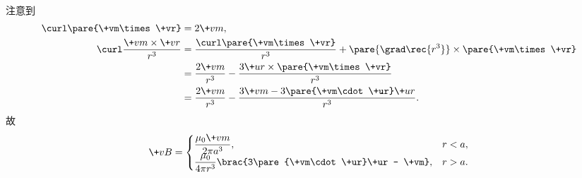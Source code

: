 \documentclass[hidelinks]{ctexart}
\begin{document}
\begin{sample}
\begin{ex}
\begin{align*}
        \end{align*}
        注意到
        \begin{align*}
            \curl \pare{\+vm\times \+vr} &= 2\+vm, \\
            \curl \frac{\+vm\times \+vr}{r^3} &= \frac{\curl\pare{\+vm\times \+vr}}{r^3} + \pare{\grad \rec{r^3}}\times \pare{\+vm\times \+vr} \\
            &= \frac{2\+vm}{r^3} - \frac{3\+ur\times \pare{\+vm\times \+vr}}{r^3} \\
            &= \frac{2\+vm}{r^3} - \frac{3\+vm - 3\pare{\+vm\cdot \+ur}\+ur}{r^3}.
        \end{align*}
        故
        \[ \+vB = \begin{cases}
            \displaystyle \frac{\mu_0 \+vm}{2\pi a^3}, & r<a, \\
            \displaystyle \frac{\mu_0}{4\pi r^3}\brac{3\pare{\+vm\cdot \+ur}\+ur - \+vm}, & r>a.
        \end{cases} \]
    \end{ex}
\end{sample}


\label{ssub:a_的多极展开}
\end{document}
